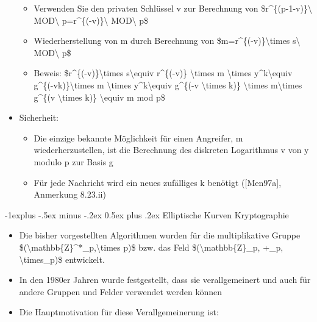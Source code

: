 \documentclass[a4paper]{article}
\makeatletter
\renewcommand{\subsection}{\@startsection{subsection}{2}{0mm}%
 {-1explus -.5ex minus -.2ex}%
 {0.5ex plus .2ex}%
 {\normalfont\normalsize\bfseries}}
\makeatother
\begin{document}
\begin{multicols}{3}
\begin{itemize}
              \begin{itemize}
                  \item
                        Verwenden Sie den privaten Schlüssel v zur Berechnung von
                        \$r\^{}\{(p-1-v)\}\textbackslash{} MOD\textbackslash{}
                        p=r\^{}\{(-v)\}\textbackslash{} MOD\textbackslash{} p\$
                  \item
                        Wiederherstellung von m durch Berechnung von
                        \$m=r\^{}\{(-v)\}\textbackslash times s\textbackslash{}
                        MOD\textbackslash{} p\$
                  \item
                        Beweis: \$r\^{}\{(-v)\}\textbackslash times s\textbackslash equiv
                        r\^{}\{(-v)\} \textbackslash times m \textbackslash times
                        y\^{}k\textbackslash equiv g\^{}\{(-vk)\}\textbackslash times m
                        \textbackslash times y\^{}k\textbackslash equiv g\^{}\{(-v
                        \textbackslash times k)\} \textbackslash times m\textbackslash times
                        g\^{}\{(v \textbackslash times k)\} \textbackslash equiv m mod p\$
              \end{itemize}
        \item
              Sicherheit:

              \begin{itemize}
                  \item
                        Die einzige bekannte Möglichkeit für einen Angreifer, m
                        wiederherzustellen, ist die Berechnung des diskreten Logarithmus v
                        von y modulo p zur Basis g
                  \item
                        Für jede Nachricht wird ein neues zufälliges k benötigt
                        ({[}Men97a{]}, Anmerkung 8.23.ii)
              \end{itemize}
    \end{itemize}


    \subsection{Elliptische Kurven
        Kryptographie}

    \begin{itemize}
        \item
              Die bisher vorgestellten Algorithmen wurden für die multiplikative
              Gruppe \$(\textbackslash mathbb\{Z\}\^{}*\_p,\textbackslash times p)\$
              bzw. das Feld \$(\textbackslash mathbb\{Z\}\_p, +\_p,
              \textbackslash times\_p)\$ entwickelt.
        \item
              In den 1980er Jahren wurde festgestellt, dass sie verallgemeinert und
              auch für andere Gruppen und Felder verwendet werden können
        \item
              Die Hauptmotivation für diese Verallgemeinerung ist:


\end{itemize}
\end{multicols}
\end{document}
